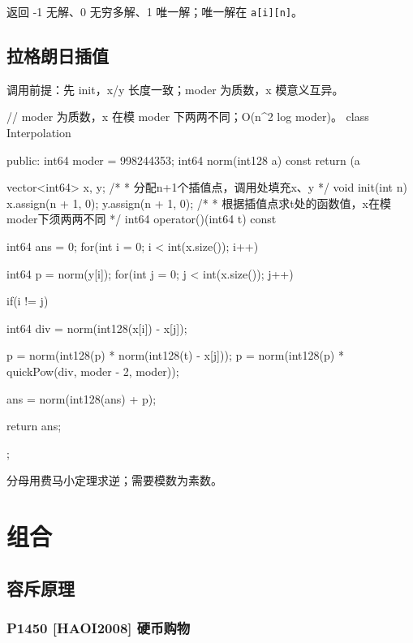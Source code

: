\vspace{-0.9\baselineskip}
\begin{codeline}[firstnumber=93]
}
\end{codeline}
\begin{warnbox}
返回 -1 无解、0 无穷多解、1 唯一解；唯一解在 \texttt{a[i][n]}。
\end{warnbox}

\section{拉格朗日插值}
调用前提：先 init，x/y 长度一致；moder 为质数，x 模意义互异。


\begin{codeline}
// moder 为质数，x 在模 moder 下两两不同；O(n^2 log moder)。
class Interpolation {
public:
    int64 moder = 998244353;
    int64 norm(int128 a) const {
        return (a %
    }

    vector<int64> x, y;
    /*
     * 分配n+1个插值点，调用处填充x、y
     */
    void init(int n) {
        x.assign(n + 1, 0);
        y.assign(n + 1, 0);
    }
    /*
     * 根据插值点求t处的函数值，x在模moder下须两两不同
     */
    int64 operator()(int64 t) const {
        int64 ans = 0;
        for(int i = 0; i < int(x.size()); i++) {
            int64 p = norm(y[i]);
            for(int j = 0; j < int(x.size()); j++) {
                if(i != j) {
                    int64 div = norm(int128(x[i]) - x[j]);

                    p = norm(int128(p) * norm(int128(t) - x[j]));
                    p = norm(int128(p) * quickPow(div, moder - 2, moder));
                }
            }
            ans = norm(int128(ans) + p);
        }
        return ans;
    }
};
\end{codeline}
\begin{warnbox}
分母用费马小定理求逆；需要模数为素数。
\end{warnbox}


\chapter{组合}

\section{容斥原理}
\subsection{P1450 {[}HAOI2008{]} 硬币购物}\label{p1450-haoi2008-ux786cux5e01ux8d2dux7269}


